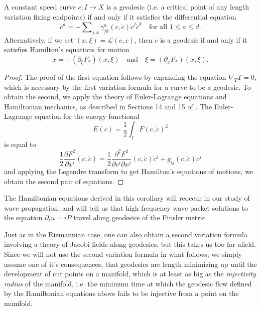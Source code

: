 \begin{corollary}
  A constant speed curve $c: I \to X$ is a geodesic (i.e. a critical point of any length variation fixing endpoints) if and only if it satisfies the differential equation
  \[ \ddot{c}^a = - \sum\nolimits_{j,k} \gamma^a_{jk}(c,\dot{c}) \dot{c}^j \dot{c}^k \quad\text{for all $1 \leq a \leq d$}. \]
  Alternatively, if we set $(x,\xi) = \mathcal{L}(c,\dot{c})$, then $c$ is a geodesic if and only if it satisfies Hamilton's equations for motion
  \[ \dot{x} = - (\partial_\xi F_*)(x,\xi) \quad\text{and}\quad \dot{\xi} = (\partial_x F_*)(x,\xi). \]

\end{corollary}
\begin{proof}
  The proof of the first equation follows by expanding the equation $\nabla_T T = 0$, which is necessary by the first variation formula for a curve to be a geodesic. To obtain the second, we apply the theory of Euler-Lagrange equations and Hamiltonian mechanics, as described in Sections 14 and 15 of \cite{Arnold}. The Euler-Lagrange equation for the energy functional
  \begin{equation}
    E(c) = \frac{1}{2} \int_I F(c,\dot{c})^2
  \end{equation}
  is equal to
  \begin{equation}
    \frac{1}{2} \frac{\partial F^2}{\partial x^i}(c,\dot{c}) = \frac{1}{2} \frac{\partial^2 F^2}{\partial v^i \partial x^j}(c,\dot{c}) \dot{c}^j + g_{ij}(c,\dot{c}) \ddot{c}^j
  \end{equation}
  and applying the Legendre transform to get Hamilton's equations of motions, we obtain the second pair of equations.
\end{proof}

\begin{remark}
  The Hamiltonian equations derived in this corollary will reoccur in our study of wave propagation, and will tell us that high frequency wave packet solutions to the equation $\partial_t u = i P$ travel along geodesics of the Finsler metric.
\end{remark}

Just as in the Riemannian case, one can also obtain a second variation formula involving a theory of Jacobi fields along geodesics, but this takes us too far afield. Since we will not use the second variation formula in what follows, we simply assume one of it's consequences, that geodesics are length minimizing up until the development of cut points on a manifold, which is at least as big as the \emph{injectivity radius} of the manifold, i.e. the minimum time at which the geodesic flow defined by the Hamiltonian equations above fails to be injective from a point on the manifold.

